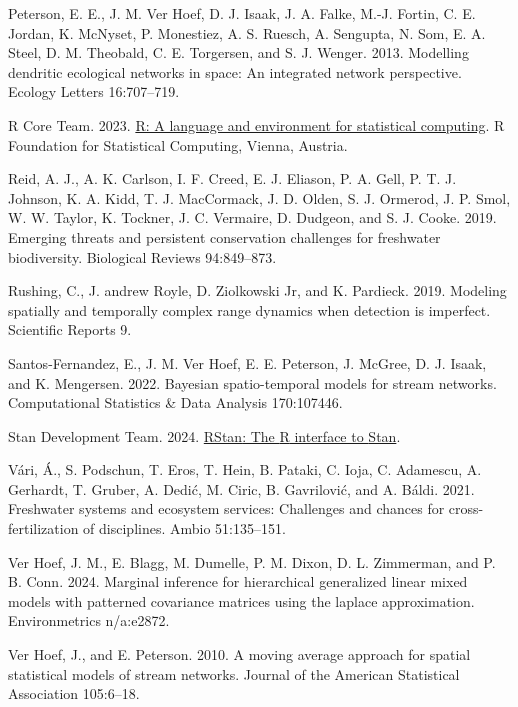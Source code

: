 \documentclass[
  11pt,
  a4paper,
]{article}
\newlength{\cslhangindent}
\newenvironment{CSLReferences}[2] %
 {\begin{list}{}{%
  \setlength{\itemindent}{0pt}
  \setlength{\leftmargin}{0pt}
  \setlength{\parsep}{0pt}
  \ifodd #1
   \setlength{\leftmargin}{\cslhangindent}
   \setlength{\itemindent}{-1\cslhangindent}
  \fi
  \setlength{\itemsep}{#2\baselineskip}}}
 {\end{list}}
\begin{document}
\begin{CSLReferences}{1}{0}
Peterson, E. E., J. M. Ver Hoef, D. J. Isaak, J. A. Falke, M.-J. Fortin, C. E. Jordan, K. McNyset, P. Monestiez, A. S. Ruesch, A. Sengupta, N. Som, E. A. Steel, D. M. Theobald, C. E. Torgersen, and S. J. Wenger. 2013. Modelling dendritic ecological networks in space: An integrated network perspective. Ecology Letters 16:707--719.

R Core Team. 2023. \href{https://www.R-project.org/}{R: A language and environment for statistical computing}. R Foundation for Statistical Computing, Vienna, Austria.

Reid, A. J., A. K. Carlson, I. F. Creed, E. J. Eliason, P. A. Gell, P. T. J. Johnson, K. A. Kidd, T. J. MacCormack, J. D. Olden, S. J. Ormerod, J. P. Smol, W. W. Taylor, K. Tockner, J. C. Vermaire, D. Dudgeon, and S. J. Cooke. 2019. Emerging threats and persistent conservation challenges for freshwater biodiversity. Biological Reviews 94:849--873.

Rushing, C., J. andrew Royle, D. Ziolkowski Jr, and K. Pardieck. 2019. Modeling spatially and temporally complex range dynamics when detection is imperfect. Scientific Reports 9.

Santos-Fernandez, E., J. M. Ver Hoef, E. E. Peterson, J. McGree, D. J. Isaak, and K. Mengersen. 2022. Bayesian spatio-temporal models for stream networks. Computational Statistics \& Data Analysis 170:107446.

Stan Development Team. 2024. \href{https://mc-stan.org/}{{RStan}: The {R} interface to {Stan}}.

Vári, Á., S. Podschun, T. Eros, T. Hein, B. Pataki, C. Ioja, C. Adamescu, A. Gerhardt, T. Gruber, A. Dedić, M. Ciric, B. Gavrilović, and A. Báldi. 2021. Freshwater systems and ecosystem services: Challenges and chances for cross-fertilization of disciplines. Ambio 51:135--151.

Ver Hoef, J. M., E. Blagg, M. Dumelle, P. M. Dixon, D. L. Zimmerman, and P. B. Conn. 2024. Marginal inference for hierarchical generalized linear mixed models with patterned covariance matrices using the laplace approximation. Environmetrics n/a:e2872.

Ver Hoef, J., and E. Peterson. 2010. A moving average approach for spatial statistical models of stream networks. Journal of the American Statistical Association 105:6--18.


\end{CSLReferences}
\end{document}
